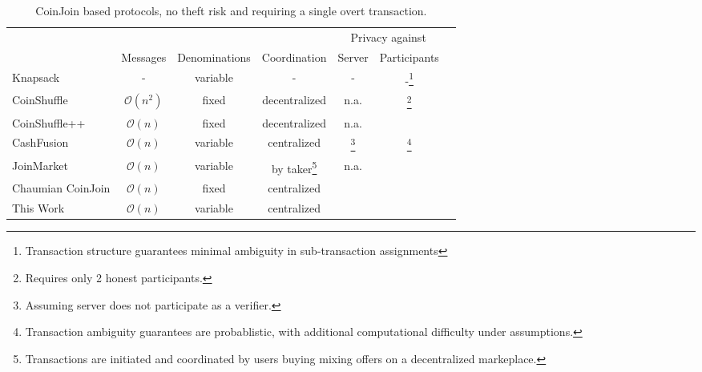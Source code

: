\documentclass[a4paper]{article}
\newcommand{\cmark}{\ding{51}}%
\begin{document}
\begin{table}[h!]
\begin{minipage}{\textwidth}
\renewcommand{\thefootnote}{\thempfootnote} %
\centering
\begin{tabular}{lcccccc}
	&&&& \multicolumn{2}{c}{Privacy against}  \\
	&Messages & Denominations & Coordination & Server & Participants \\

	Knapsack~\cite{maurer2017anonymous} & - & variable & - & - & -\footnote{Transaction structure guarantees minimal ambiguity in sub-transaction assignments} \\
	CoinShuffle~\cite{ruffing2014coinshuffle} &$\mathcal{O}(n^2)$ & fixed & decentralized & n.a. & \cmark\footnote{Requires only 2 honest participants.} \\
	CoinShuffle++~\cite{ruffing2017p2p} & $\mathcal{O}(n)$ & fixed & decentralized & n.a. & \cmark\footnotemark[\value{footnote}] \\
	CashFusion & $\mathcal{O}(n)$ & variable & centralized & \cmark\footnote{Assuming server does not participate as a verifier.} & \cmark\footnote{Transaction ambiguity guarantees are probablistic, with additional computational difficulty under assumptions.} \\
	JoinMarket & $\mathcal{O}(n)$ & variable & by taker\footnote{Transactions are initiated and coordinated by users buying mixing offers on a decentralized markeplace.} & n.a.\footnotemark[\value{footnote}] & \cmark \\
	Chaumian CoinJoin & $\mathcal{O}(n)$ & fixed & centralized & \cmark & \cmark \\
	This Work & $\mathcal{O}(n)$ & variable & centralized & \cmark & \cmark \\
\end{tabular}
\end{minipage}
\caption{CoinJoin based protocols, no theft risk and requiring a single overt transaction.}
\label{table:coinjoin}
\end{table}
\end{document}
